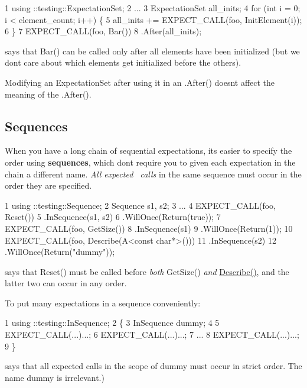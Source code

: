 \begin{DoxyCode}
1 using ::testing::ExpectationSet;
2 ...
3 ExpectationSet all\_inits;
4 for (int i = 0; i < element\_count; i++) \{
5   all\_inits += EXPECT\_CALL(foo, InitElement(i));
6 \}
7 EXPECT\_CALL(foo, Bar())
8     .After(all\_inits);
\end{DoxyCode}
 says that {\ttfamily Bar()} can be called only after all elements have been initialized (but we don\textquotesingle{}t care about which elements get initialized before the others).

Modifying an {\ttfamily Expectation\+Set} after using it in an {\ttfamily .After()} doesn\textquotesingle{}t affect the meaning of the {\ttfamily .After()}.

\subsection*{Sequences}

When you have a long chain of sequential expectations, it\textquotesingle{}s easier to specify the order using {\bfseries sequences}, which don\textquotesingle{}t require you to given each expectation in the chain a different name. {\itshape All expected~\newline
 calls} in the same sequence must occur in the order they are specified.


\begin{DoxyCode}
1 using ::testing::Sequence;
2 Sequence s1, s2;
3 ...
4 EXPECT\_CALL(foo, Reset())
5     .InSequence(s1, s2)
6     .WillOnce(Return(true));
7 EXPECT\_CALL(foo, GetSize())
8     .InSequence(s1)
9     .WillOnce(Return(1));
10 EXPECT\_CALL(foo, Describe(A<const char*>()))
11     .InSequence(s2)
12     .WillOnce(Return("dummy"));
\end{DoxyCode}
 says that {\ttfamily Reset()} must be called before {\itshape both} {\ttfamily Get\+Size()} {\itshape and} {\ttfamily \hyperlink{namespacetesting_1_1gmock__matchers__test_a36ae44e4f6c8e9fe3fe9162132503717}{Describe()}}, and the latter two can occur in any order.

To put many expectations in a sequence conveniently\+: 
\begin{DoxyCode}
1 using ::testing::InSequence;
2 \{
3   InSequence dummy;
4 
5   EXPECT\_CALL(...)...;
6   EXPECT\_CALL(...)...;
7   ...
8   EXPECT\_CALL(...)...;
9 \}
\end{DoxyCode}
 says that all expected calls in the scope of {\ttfamily dummy} must occur in strict order. The name {\ttfamily dummy} is irrelevant.)

